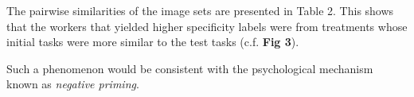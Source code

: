\documentclass[12pt]{article}
\begin{document}
The pairwise similarities of the image sets are presented in Table 2. This 
shows that the workers that yielded higher specificity labels were from 
treatments whose initial tasks were more similar to the test tasks (c.f.
\textbf{Fig 3}).

Such a phenomenon would be consistent with the psychological mechanism known as
\textit{negative priming}.
\end{document}
